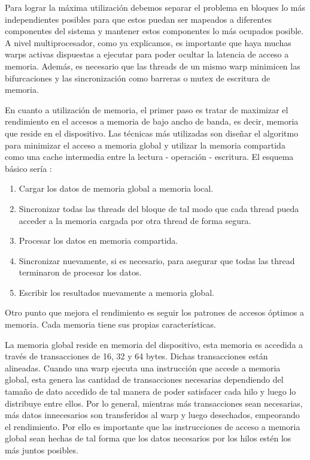 \documentclass[a4paper,openright,12pt, oneside]{book}
\begin{document}
Para lograr la m\'axima utilizaci\'on debemos separar el problema en bloques lo m\'as
independientes posibles para que estos puedan ser mapeados a diferentes componentes
del sistema y mantener estos componentes lo m\'as ocupados posible. A nivel multiprocesador,
como ya explicamos, es importante que haya muchas warps activas
dispuestas a ejecutar para poder ocultar la latencia de acceso a memoria. Adem\'as,
es necesario que las threads de un mismo warp minimicen las bifurcaciones y las sincronizaci\'on
como barreras o mutex de escritura de memoria.

En cuanto a utilizaci\'on de memoria, el primer paso es tratar de maximizar el rendimiento
en el accesos a memoria de bajo ancho de banda, es decir, memoria que reside en el dispositivo.
Las t\'ecnicas m\'as utilizadas son dise\~nar el algoritmo para minimizar el acceso a memoria global
y utilizar la memoria compartida como una cache intermedia entre la lectura - operaci\'on -
escritura. El esquema b\'asico ser\'ia :

\begin{enumerate}
\item Cargar los datos de memoria global a memoria local.
\item Sincronizar todas las threads del bloque de tal modo que cada thread pueda
acceder a la memoria cargada por otra thread de forma segura.
\item Procesar los datos en memoria compartida.
\item Sincronizar nuevamente, si es necesario, para asegurar que todas las thread
terminaron de procesar los datos.
\item Escribir los resultados nuevamente a memoria global.
\end{enumerate}

Otro punto que mejora el rendimiento es seguir los patrones de accesos \'optimos a memoria.
Cada memoria tiene sus propias caracter\'isticas.

La memoria global reside en memoria del dispositivo, esta memoria es accedida
a trav\'es de transacciones de 16, 32 y 64 bytes. Dichas transacciones est\'an
alineadas. Cuando una warp ejecuta una instrucci\'on que accede a memoria global, 
esta genera las cantidad de transacciones necesarias dependiendo del tama\~no de dato
accedido de tal manera de poder satisfacer cada hilo y luego lo distribuye entre ellos.
Por lo general, mientras m\'as transacciones sean necesarias, m\'as datos innecesarios
son transferidos al warp y luego desechados, empeorando el rendimiento. Por ello
es importante que las instrucciones de acceso a memoria global sean hechas de tal
forma que los datos necesarios por los hilos est\'en los m\'as juntos posibles.
\end{document}
